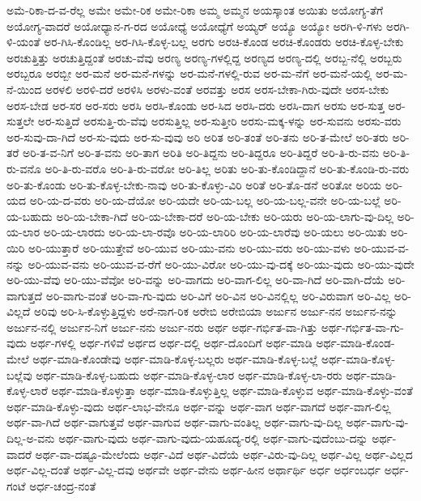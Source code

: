 {ಅಮೆ-ರಿಕಾ-ದ-ವ-ರೆಲ್ಲ
ಅಮೇ
ಅಮೇ-ರಿಕ
ಅಮೇ-ರಿಕಾ
ಅಮ್ಮ
ಅಮ್ಮನ
ಅಯಸ್ಕಾಂತ
ಅಯಿತು
ಅಯೋಗ್ಯ-ತೆಗೆ
ಅಯೋಗ್ಯ-ವಾದರೆ
ಅಯೋಧ್ಯಾನ-ಗ-ರದ
ಅಯೋಧ್ಯೆ
ಅಯೋಧ್ಯೆಗೆ
ಅಯ್ಯರ್
ಅಯ್ಯೊ
ಅಯ್ಯೋ
ಅರಗಿ-ಳಿ-ಗಳು
ಅರಗಿ-ಳಿ-ಯಂತೆ
ಅರ-ಗಿಸಿ-ಕೊಂಡಿಲ್ಲ
ಅರ-ಗಿಸಿ-ಕೊಳ್ಳ-ಬಲ್ಲ
ಅರಗು
ಅರಚಿ-ಕೊಂಡ
ಅರಚಿ-ಕೊಂಡರು
ಅರಚಿ-ಕೊಳ್ಳ-ಬೇಕು
ಅರಚುತ್ತಿತ್ತು
ಅರಚುತ್ತಿದ್ದಂತೆ
ಅರಚು-ವೆವು
ಅರಣ್ಯ
ಅರಣ್ಯ-ಗಳಲ್ಲಿದ್ದ
ಅರಣ್ಯದ
ಅರಣ್ಯ-ದಲ್ಲಿ
ಅರಬ್ಬ-ನೆಲ್ಲಿ
ಅರಬ್ಬರು
ಅರಬ್ಬರೂ
ಅರಬ್ಬೀ
ಅರ-ಮನೆ
ಅರ-ಮನೆ-ಗಳನ್ನು
ಅರ-ಮನೆ-ಗಳಲ್ಲಿ-ರುವ
ಅರ-ಮ-ನೆಗೆ
ಅರ-ಮನೆ-ಯಲ್ಲಿ
ಅರ-ಮ-ನೆ-ಯಿಂದ
ಅರಳಲಿ
ಅರಳಿ-ದರೆ
ಅರಳಿಸಿ
ಅರಳು-ವಂತೆ
ಅರವತ್ತು
ಅರಸ
ಅರಸ-ಬೇಕಾ-ಗಿರು-ವುದೇ
ಅರಸ-ಬೇಕು
ಅರಸ-ಬೇಡ
ಅರ-ಸರ
ಅರ-ಸರು
ಅರಸಿ
ಅರಸಿ-ಕೊಂಡು
ಅರ-ಸಿದ
ಅರಸಿ-ದರು
ಅರಸಿ-ದಾಗ
ಅರಸು
ಅರ-ಸುತ್ತ
ಅರ-ಸುತ್ತಲೇ
ಅರ-ಸುತ್ತಿದೆ
ಅರಸುತ್ತಿ-ರು-ವೆವು
ಅರಸುತ್ತಿಲ್ಲ
ಅರ-ಸುತ್ತೀರಿ
ಅರಸು-ಮಕ್ಕ-ಳನ್ನು
ಅರ-ಸುವನು
ಅರಸು-ವರು
ಅರ-ಸುವು-ದಾ-ಗಿದೆ
ಅರ-ಸು-ವುದು
ಅರ-ಸು-ವುವು
ಅರಿ
ಅರಿತ
ಅರಿ-ತಂತೆ
ಅರಿ-ತನು
ಅರಿ-ತ-ಮೇಲೆ
ಅರಿ-ತರು
ಅರಿ-ತರೆ
ಅರಿ-ತ-ವ-ನಿಗೆ
ಅರಿ-ತ-ವನು
ಅರಿ-ತಾಗ
ಅರಿತಿ
ಅರಿ-ತಿದ್ದನು
ಅರಿ-ತಿದ್ದರೂ
ಅರಿ-ತಿದ್ದರೆ
ಅರಿ-ತಿ-ರು-ವನು
ಅರಿ-ತಿ-ರು-ವನೊ
ಅರಿ-ತಿ-ರು-ವರೊ
ಅರಿ-ತಿ-ರು-ವರೋ
ಅರಿ-ತಿಲ್ಲ
ಅರಿತು
ಅರಿ-ತು-ಕೊಂಡಿದ್ದಾನೆ
ಅರಿ-ತು-ಕೊಂಡಿ-ರು-ವರು
ಅರಿ-ತು-ಕೊಂಡು
ಅರಿ-ತು-ಕೊಳ್ಳ-ಬೇಕು-ನಾವು
ಅರಿ-ತು-ಕೊಳ್ಳು-ವಿರಿ
ಅರಿತೆ
ಅರಿ-ತೊ-ಡನೆ
ಅರಿತೋ
ಅರಿಯ
ಅರಿ-ಯದ
ಅರಿ-ಯ-ದ-ವರು
ಅರಿ-ಯ-ದೆಯೋ
ಅರಿ-ಯದೇ
ಅರಿ-ಯ-ಬಲ್ಲ
ಅರಿ-ಯ-ಬಲ್ಲ-ವನೇ
ಅರಿ-ಯ-ಬಲ್ಲೆ
ಅರಿ-ಯ-ಬಹುದು
ಅರಿ-ಯ-ಬೇಕಾ-ಗಿದೆ
ಅರಿ-ಯ-ಬೇಕಾ-ದರೆ
ಅರಿ-ಯ-ಬೇಕು
ಅರಿ-ಯರು
ಅರಿ-ಯ-ಲಾಗು-ವು-ದಿಲ್ಲ
ಅರಿ-ಯ-ಲಾರ
ಅರಿ-ಯ-ಲಾರದು
ಅರಿ-ಯ-ಲಾ-ರವೊ
ಅರಿ-ಯ-ಲಾರಿರಿ
ಅರಿ-ಯ-ಲಾರೆವು
ಅರಿ-ಯಲು
ಅರಿ-ಯಿತು
ಅರಿ-ಯಿರಿ
ಅರಿ-ಯುತ್ತಾರೆ
ಅರಿ-ಯುತ್ತೇವೆ
ಅರಿ-ಯುವ
ಅರಿ-ಯು-ವನು
ಅರಿ-ಯು-ವರು
ಅರಿ-ಯು-ವಳು
ಅರಿ-ಯುವ-ವ-ನನ್ನು
ಅರಿ-ಯುವ-ವನು
ಅರಿ-ಯುವ-ವ-ರೆಗೆ
ಅರಿ-ಯು-ವಿರೋ
ಅರಿ-ಯು-ವು-ದಕ್ಕೆ
ಅರಿ-ಯು-ವುದು
ಅರಿ-ಯು-ವುದೇ
ಅರಿ-ಯು-ವೆವು
ಅರಿ-ಯು-ವೆವೋ
ಅರಿ-ವನ್ನು
ಅರಿ-ವಾಗದು
ಅರಿ-ವಾಗ-ಲಿಲ್ಲ
ಅರಿ-ವಾ-ಗಿದೆ
ಅರಿ-ವಾಗಿ-ದೆಯೆ
ಅರಿ-ವಾಗುತ್ತದೆ
ಅರಿ-ವಾಗು-ವಂತೆ
ಅರಿ-ವಾ-ಗು-ವುದು
ಅರಿ-ವಿಗೆ
ಅರಿ-ವಿನ
ಅರಿ-ವಿನಲ್ಲಿಲ್ಲ
ಅರಿ-ವಿರುವಾಗ
ಅರಿ-ವಿಲ್ಲ
ಅರಿ-ವಿಲ್ಲದೆ
ಅರಿವು
ಅರಿ-ಸಿ-ಕೊಳ್ಳುತ್ತಿದ್ದಳು
ಅರೆ-ನಾಗ-ರಿಕ
ಅರೇಬಿ
ಅರೇಬಿಯಾ
ಅರ್ಜುನ
ಅರ್ಜು-ನನ
ಅರ್ಜುನ-ನನ್ನು
ಅರ್ಜುನ-ನಲ್ಲಿ
ಅರ್ಜುನ-ನಿಗೆ
ಅರ್ಜು-ನನು
ಅರ್ಜು-ನರು
ಅರ್ಥ
ಅರ್ಥ-ಗರ್ಭಿತ-ವಾ-ಗಿತ್ತು
ಅರ್ಥ-ಗರ್ಭಿತ-ವಾ-ಗು-ವುದು
ಅರ್ಥ-ಗಳಲ್ಲಿ
ಅರ್ಥ-ಗಳಿವೆ
ಅರ್ಥದ
ಅರ್ಥ-ದಲ್ಲಿ
ಅರ್ಥ-ದೊಂದಿಗೆ
ಅರ್ಥ-ಮಾಡಿ
ಅರ್ಥ-ಮಾಡಿ-ಕೊಂಡ-ಮೇಲೆ
ಅರ್ಥ-ಮಾಡಿ-ಕೊಂಡೇವು
ಅರ್ಥ-ಮಾಡಿ-ಕೊಳ್ಳ-ಬಲ್ಲರು
ಅರ್ಥ-ಮಾಡಿ-ಕೊಳ್ಳ-ಬಲ್ಲೆ
ಅರ್ಥ-ಮಾಡಿ-ಕೊಳ್ಳ-ಬಲ್ಲೆವು
ಅರ್ಥ-ಮಾಡಿ-ಕೊಳ್ಳ-ಬಹುದು
ಅರ್ಥ-ಮಾಡಿ-ಕೊಳ್ಳ-ಲಾರ
ಅರ್ಥ-ಮಾಡಿ-ಕೊಳ್ಳ-ಲಾ-ರರು
ಅರ್ಥ-ಮಾಡಿ-ಕೊಳ್ಳ-ಲಾರೆ
ಅರ್ಥ-ಮಾಡಿ-ಕೊಳ್ಳುತ್ತಾ
ಅರ್ಥ-ಮಾಡಿ-ಕೊಳ್ಳುತ್ತಿಲ್ಲ
ಅರ್ಥ-ಮಾಡಿ-ಕೊಳ್ಳುವ
ಅರ್ಥ-ಮಾಡಿ-ಕೊಳ್ಳು-ವಂತೆ
ಅರ್ಥ-ಮಾಡಿ-ಕೊಳ್ಳು-ವುದು
ಅರ್ಥ-ಲಾಭ-ವೇನೂ
ಅರ್ಥ-ವನ್ನು
ಅರ್ಥ-ವಾಗ
ಅರ್ಥ-ವಾಗದೆ
ಅರ್ಥ-ವಾಗ-ಲಿಲ್ಲ
ಅರ್ಥ-ವಾ-ಗಿದೆ
ಅರ್ಥ-ವಾಗುತ್ತವೆ
ಅರ್ಥ-ವಾಗುವ
ಅರ್ಥ-ವಾಗು-ವಂತಿಲ್ಲ
ಅರ್ಥ-ವಾಗು-ವು-ದಿಲ್ಲ
ಅರ್ಥ-ವಾಗು-ವು-ದಿಲ್ಲ-ಅ-ವನು
ಅರ್ಥ-ವಾಗು-ವುದು
ಅರ್ಥ-ವಾಗು-ವುದು-ಯಹೂದ್ಯ-ರಲ್ಲಿ
ಅರ್ಥ-ವಾಗು-ವುದೆಂಬು-ದನ್ನು
ಅರ್ಥ-ವಾದರೆ
ಅರ್ಥ-ವಾ-ದಷ್ಟೂ-ಮೇಲೆಂದು
ಅರ್ಥ-ವಿದೆ
ಅರ್ಥ-ವಿದೆಯೆ
ಅರ್ಥ-ವಿರು-ವು-ದಿಲ್ಲ
ಅರ್ಥ-ವಿಲ್ಲ
ಅರ್ಥ-ವಿಲ್ಲದ
ಅರ್ಥ-ವಿಲ್ಲ-ದಂತೆ
ಅರ್ಥ-ವಿಲ್ಲ-ದವು
ಅರ್ಥವೇ
ಅರ್ಥ-ವೇನು
ಅರ್ಥ-ಹೀನ
ಅರ್ಥಾರ್ಥಿ
ಅರ್ಧ
ಅರ್ಧಂಬರ್ಧ
ಅರ್ಧ-ಗಂಟೆ
ಅರ್ಧ-ಚಂದ್ರ-ನಂತೆ
}
